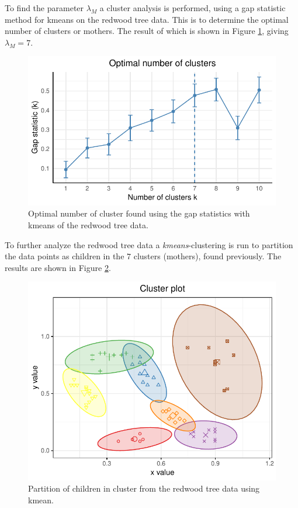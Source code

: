 To find the parameter $\lambda_M$ a cluster analysis is performed, using a gap statistic method for kmeans on the redwood tree data. This is to determine the optimal number of clusters or mothers. The result of which is shown in Figure \ref{fig:numb_clust}, giving $\lambda_M = 7$.

\begin{figure}
    \centering
    \includegraphics[scale=0.9]{figures/numb_clusters.pdf}
    \caption{Optimal number of cluster found using the gap statistics with kmeans of the redwood tree data.}
    \label{fig:numb_clust}
\end{figure}

To further analyze the redwood tree data a \textit{kmeans}-clustering is run to partition the data points as children in the $7$ clusters (mothers), found previously. The results are shown in Figure \ref{fig:cluster_part}. 

\begin{figure}
    \centering
    \includegraphics[scale=0.9]{figures/redwood_cluster_partitioning.pdf}
    \caption{Partition of children in cluster from the redwood tree data using kmean.}
    \label{fig:cluster_part}
\end{figure}

